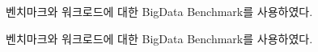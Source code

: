 \fi



\ifkor
벤치마크와 워크로드에 대한 BigData Benchmark를 사용하였다.
\else

\fi




\ifkor
벤치마크와 워크로드에 대한 BigData Benchmark를 사용하였다.
\else

\fi




